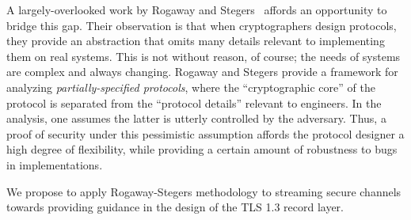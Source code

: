 A largely-overlooked work by Rogaway and Stegers~\cite{RS09}
affords an opportunity to bridge this gap. Their observation is that when
cryptographers design protocols, they provide an abstraction that omits many
details relevant to implementing them on real systems.
%
This is not without reason, of course; the needs of systems are complex and always
changing.
%
%
Rogaway and Stegers provide a framework for analyzing \emph{partially-specified
protocols}, where the ``cryptographic core'' of the protocol is separated from
the ``protocol details'' relevant to engineers. In the analysis, one assumes the
latter is utterly controlled by the adversary. Thus, a proof of security under
this pessimistic assumption affords the protocol designer a high degree of
flexibility, while providing a certain amount of robustness to bugs in
implementations.

\begin{task}\label{task:sc}
  We propose to apply Rogaway-Stegers methodology to streaming secure channels
  towards providing guidance in the design of the TLS 1.3 record layer.
\end{task}


\fi
%


